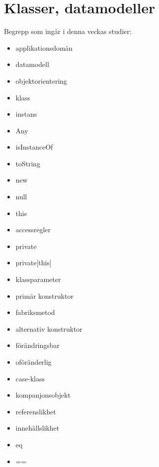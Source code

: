 \chapter{Klasser, datamodeller}\label{chapter:W05}
Begrepp som ingår i denna veckas studier:
\begin{itemize}[noitemsep,label={$\square$},leftmargin=*]
\item applikationsdomän
\item datamodell
\item objektorientering
\item klass
\item instans
\item Any
\item isInstanceOf
\item toString
\item new
\item null
\item this
\item accessregler
\item private
\item private[this]
\item klassparameter
\item primär konstruktor
\item fabriksmetod
\item alternativ konstruktor
\item förändringsbar
\item oföränderlig
\item case-klass
\item kompanjonsobjekt
\item referenslikhet
\item innehållslikhet
\item eq
\item ==\end{itemize}
